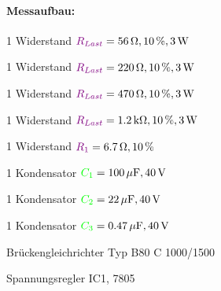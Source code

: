 \documentclass[11pt,a4paper,titlepage]{scrreprt}
\newcommand{\widerstand}[1]{\textcolor{violet}{#1}}
\newcommand{\capacity}[1]{\textcolor{green}{#1}}
\begin{document}
            \paragraph{Messaufbau:}
            \begin{itemize*}
                \item 1 Widerstand $\widerstand{R_{Last}} = \SI{56}{\ohm}, 10\,\%, \SI{3}{\watt}$
                \item 1 Widerstand $\widerstand{R_{Last}} = \SI{220}{\ohm}, 10\,\%, \SI{3}{\watt}$
                \item 1 Widerstand $\widerstand{R_{Last}} = \SI{470}{\ohm}, 10\,\%, \SI{3}{\watt}$
                \item 1 Widerstand $\widerstand{R_{Last}} = \SI{1,2}{\kilo\ohm}, 10\,\%, \SI{3}{\watt}$
                \item 1 Widerstand $\widerstand{R_1} = \SI{6,7}{\ohm}, 10\,\%$
                \item 1 Kondensator $\capacity{C_1} = \SI{100}{\mu\farad}, \SI{40}{\volt}$
                \item 1 Kondensator $\capacity{C_2} = \SI{22}{\mu\farad}, \SI{40}{\volt}$
                \item 1 Kondensator $\capacity{C_3} = \SI{0,47}{\mu\farad}, \SI{40}{\volt}$
                \item Brückengleichrichter Typ B80 C 1000/1500
                \item Spannungsregler IC1, 7805
            \end{itemize*}
\end{document}
